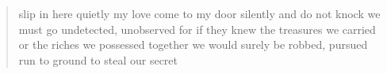 \begin{verse}
slip in here quietly my love
come to my door silently and do not knock
we must go undetected, unobserved
for if they knew the treasures we carried
or the riches we possessed together 
we would surely be robbed, pursued
run to ground to steal our secret



\end{verse}

